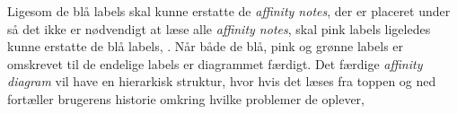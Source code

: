 %
Ligesom de blå labels skal kunne erstatte de \textit{affinity notes}, der er placeret under så det ikke er nødvendigt at læse alle \textit{affinity notes}, skal pink labels ligeledes kunne erstatte de blå labels, \parencite[s. 175]{Book:BuildingAnAffinity}. Når både de blå, pink og grønne labels er omskrevet til de endelige labels er diagrammet færdigt. Det færdige \textit{affinity diagram} vil have en hierarkisk struktur, hvor hvis det læses fra toppen og ned fortæller brugerens historie omkring hvilke problemer de oplever, \parencite[s. 25]{PDF:ConsolidationIdeationAffinity}



    


